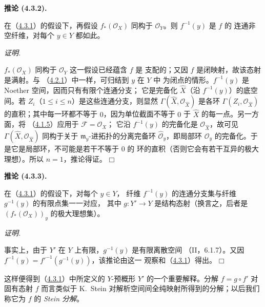 \documentclass[UTF8,fontset=none,11pt,oneside,openany]{ctexbook}
\providecommand{\square}{\mdlgwhtsquare}
\newenvironment{corollary}[1][]{%
  \par\medskip\noindent\textbf{推论 (#1).}\ %
}{\par}
\newenvironment{proof}{%
  \par\smallskip\noindent\textit{证明.}\ %
}{\hfill$\square$\par}
\let\EGAOriginalLabel\label
\renewcommand{\label}[1]{\phantomsection\EGAOriginalLabel{#1}}
\begin{document}
\begin{corollary}[4.3.2]
\label{III.4.3.2-fr}
在（\hyperref[III.4.3.1-fr]{4.3.1}）的假设下，再假设
$f_*(\mathcal O_X)$ 同构于 $\mathcal O_Y$。则 $f^{-1}(y)$ 是 $f$ 的
连通非空纤维，对每个 $y\in Y$ 都如此。
\end{corollary}

\begin{proof}
$f_*(\mathcal O_X)$ 同构于 $\mathcal O_Y$ 这一假设已经蕴含 $f$ 是
支配的；又因 $f$ 是闭映射，故该态射是满射。与
（\hyperref[III.4.2.1-fr]{4.2.1}）中一样，可归结到 $y$ 在 $Y$ 中
为闭点的情形。$f^{-1}(y)$ 是 Noether 空间，因而只有有限个连通分支；
它是完备化 $\widehat X$（沿 $f^{-1}(y)$）的底空间。若
$Z_i$（$1\leq i\leq n$）是这些连通分支，则显然
$\Gamma(\widehat X,\mathcal O_{\widehat X})$ 是各环
$\Gamma(Z_i,\mathcal O_{\widehat X})$ 的直积；其中每一环都不等于
$0$，因为单位截面不等于 $0$ 于 $\widehat X$ 的每一点。另一方面，将
（\hyperref[III.4.1.5-fr]{4.1.5}）应用于 $\mathcal F=\mathcal O_X$；
它沿 $f^{-1}(y)$ 的完备化是 $\mathcal O_{\widehat X}$，故可见
$\Gamma(\widehat X,\mathcal O_{\widehat X})$ 同构于关于
$\mathfrak m_y$-进拓扑的分离完备环 $\widehat{\mathcal O}_y$，即局部环
$\mathcal O_y$ 的完备化。于是它是局部环，不可能是若干不等于 $0$ 的
环的直积（否则它会有若干互异的极大理想）。所以 $n=1$，推论得证。
\end{proof}

\begin{corollary}[4.3.3]
\label{III.4.3.3-fr}
在（\hyperref[III.4.3.1-fr]{4.3.1}）的假设下，对每个 $y\in Y$，
纤维 $f^{-1}(y)$ 的连通分支集与纤维 $g^{-1}(y)$ 的有限点集一一对应，
其中 $g:Y'\to Y$ 是结构态射（换言之，后者是
$(f_*(\mathcal O_X))_y$ 的极大理想集）。
\end{corollary}

\begin{proof}
事实上，由于 $Y'$ 在 $Y$ 上有限，$g^{-1}(y)$ 是有限离散空间
（II，6.1.7）。又因 $f^{-1}(y)=f'^{-1}(g^{-1}(y))$，该推论由这一
观察和（\hyperref[III.4.3.1-fr]{4.3.1}）得出。
\end{proof}

这样便得到（\hyperref[III.4.3.1-fr]{4.3.1}）中所定义的 $Y$-预概形
$Y'$ 的一个重要解释。分解 $f=g\circ f'$ 对固有态射 $f$ 而言类似于
K.~Stein 对解析空间间全纯映射所得到的分解；以后我们称它为 $f$ 的
\emph{Stein 分解}。
\end{document}
